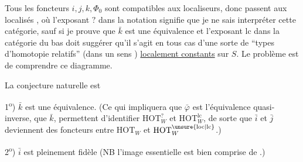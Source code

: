  Tous les  foncteurs $i,j,k,\Phi_0$ sont compatibles aux localiseurs, donc passent aux localisés
,
où l'exposant $?$ dans la notation signifie que je ne sais interpréter cette catégorie, sauf si je prouve que $\bar k$ est une équivalence\unsure{;|,} et l'exposant $\mathrm{lc}$ dans la catégorie du bas
doit suggérer   qu'il s'agit  en tous cas d'une sorte de ``types d'homotopie relatifs'' (dans un sens ) \uline{localement constants} sur $S$. Le problème est de comprendre ce diagramme.

La conjecture naturelle est

1\textsuperscript{o}) $\bar k$ est une équivalence. (Ce qui impliquera que $\bar\varphi$ est l'équivalence quasi-inverse\unsure{)}, que  $\bar k$, \inserted{$\bar\varphi$} permettent  d'identifier $\mathrm{HOT}^{?}_W$ et $\mathrm{HOT}^{\mathrm{lc}}_W$, de sorte que $\bar i$ et $\bar j$ deviennent des foncteurs entre $\mathrm{HOT}_W$ et $\mathrm{HOT}^{\unsure{\mathrm{loc}|\mathrm{lc}}}_W$.)

2\textsuperscript{o}) $\bar i$ est pleinement fidèle (NB l'image essentielle est bien comprise de .)
